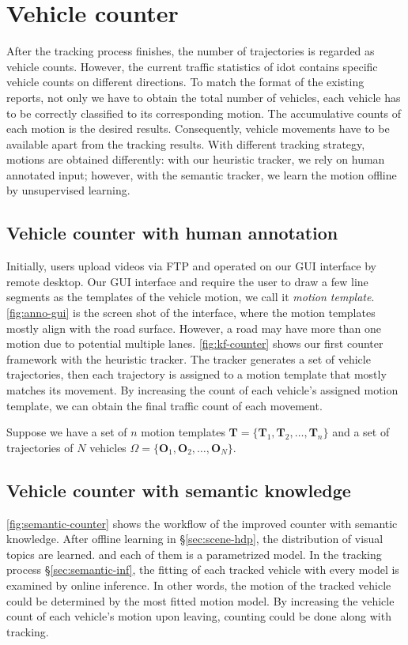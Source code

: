 \section{Vehicle counter}
\label{sec:system-counter}

After the tracking process finishes, the number of trajectories is regarded as vehicle counts.
However, the current traffic statistics of \gls{idot} contains specific vehicle counts on different directions. 
To match the format of the existing reports, not only we have to obtain the total number of vehicles, each vehicle has to be correctly classified to its corresponding motion. 
The accumulative counts of each motion is the desired results.
Consequently, vehicle movements have to be available apart from the tracking results.
With different tracking strategy, motions are obtained differently: with our heuristic tracker, we rely on human annotated input; however, with the semantic tracker, we learn the motion offline by unsupervised learning.

\subsection{Vehicle counter with human annotation}
Initially, users upload videos via FTP and operated on our GUI interface by remote desktop.
Our GUI interface and require the user to draw a few line segments as the templates of the vehicle motion, we call it \emph{motion template}.
\ref{fig:anno-gui} is the screen shot of the interface, where the motion templates mostly align with the road surface. 
However, a road may have more than one motion due to potential multiple lanes. 
\ref{fig:kf-counter} shows our first counter framework with the heuristic tracker. 
The tracker generates a set of vehicle trajectories, then each trajectory is assigned to a motion template that mostly matches its movement. 
By increasing the count of each vehicle's assigned motion template, we can obtain the final traffic count of each movement. 

Suppose we have a set of $n$ motion templates $\mathbf{T} = \{\mathbf{T}_1, \mathbf{T}_2, \dots, \mathbf{T}_n\}$ and a set of trajectories of $N$ vehicles $\Omega= \{\mathbf{O}_1, \mathbf{O}_2, \dots, \mathbf{O}_N\}$.




\subsection{Vehicle counter with semantic knowledge}
\ref{fig:semantic-counter} shows the workflow of the improved counter with semantic knowledge. 
After offline learning in \S\ref{sec:scene-hdp}, the distribution of visual topics are learned. and each of them is a parametrized model.
In the tracking process \S\ref{sec:semantic-inf}, the fitting of each tracked vehicle with every model is examined by online inference.
In other words, the motion of the tracked vehicle could be determined by the most fitted motion model. 
By increasing the vehicle count of each vehicle's motion upon leaving, counting could be done along with tracking. 

